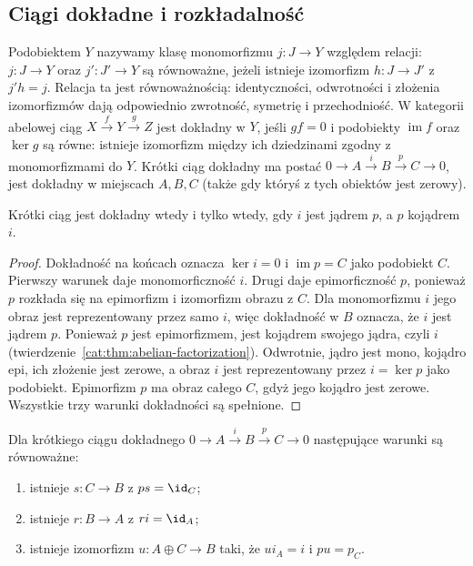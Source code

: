 \subsection{Ciągi dokładne i rozkładalność}
\begin{definicja}[Dokładność]\label{cat:def:abelian-exact}
Podobiektem $Y$ nazywamy klasę monomorfizmu $j:J\to Y$ względem relacji: $j:J\to Y$ oraz $j':J'\to Y$ są równoważne, jeżeli istnieje izomorfizm $h:J\to J'$ z $j'h=j$. Relacja ta jest równoważnością: identyczności, odwrotności i złożenia izomorfizmów dają odpowiednio zwrotność, symetrię i przechodniość.
W kategorii abelowej ciąg $X\xrightarrow{f}Y\xrightarrow{g}Z$ jest dokładny w $Y$, jeśli $gf=0$ i podobiekty $\operatorname{im}f$ oraz $\ker g$ są równe: istnieje izomorfizm między ich dziedzinami zgodny z monomorfizmami do $Y$. Krótki ciąg dokładny ma postać $0\to A\xrightarrow{i}B\xrightarrow{p}C\to0$, jest dokładny w miejscach $A,B,C$ (także gdy któryś z tych obiektów jest zerowy).
\end{definicja}
\begin{stwierdzenie}\label{cat:prop:ses-kernel-cokernel}
Krótki ciąg jest dokładny wtedy i tylko wtedy, gdy $i$ jest jądrem $p$, a $p$ kojądrem $i$.
\end{stwierdzenie}
\begin{proof}
Dokładność na końcach oznacza $\ker i=0$ i $\operatorname{im}p=C$ jako podobiekt $C$. Pierwszy warunek daje monomorficzność $i$. Drugi daje epimorficzność $p$, ponieważ $p$ rozkłada się na epimorfizm i izomorfizm obrazu z $C$. Dla monomorfizmu $i$ jego obraz jest reprezentowany przez samo $i$, więc dokładność w $B$ oznacza, że $i$ jest jądrem $p$. Ponieważ $p$ jest epimorfizmem, jest kojądrem swojego jądra, czyli $i$ (twierdzenie~\ref{cat:thm:abelian-factorization}). Odwrotnie, jądro jest mono, kojądro epi, ich złożenie jest zerowe, a obraz $i$ jest reprezentowany przez $i=\ker p$ jako podobiekt. Epimorfizm $p$ ma obraz całego $C$, gdyż jego kojądro jest zerowe. Wszystkie trzy warunki dokładności są spełnione.
\end{proof}
\begin{twierdzenie}\label{cat:thm:abelian-split}
Dla krótkiego ciągu dokładnego $0\to A\xrightarrow{i}B\xrightarrow{p}C\to0$ następujące warunki są równoważne:
\begin{enumerate}
\item istnieje $s:C\to B$ z $ps=\id_C$;
\item istnieje $r:B\to A$ z $ri=\id_A$;
\item istnieje izomorfizm $u:A\oplus C\to B$ taki, że $ui_A=i$ i $pu=p_C$.
\end{enumerate}
\end{twierdzenie}
